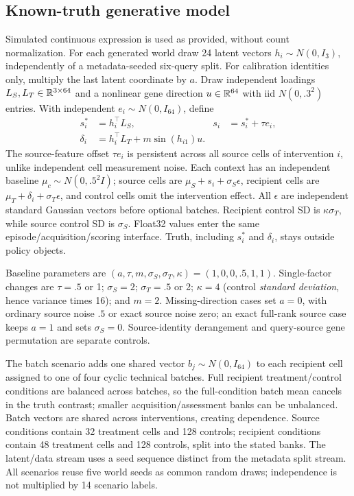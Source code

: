 \subsection{Known-truth generative model}
Simulated continuous expression is used as provided, without count normalization. For each generated world draw 24 latent vectors $h_i\sim N(0,I_3)$, independently of a metadata-seeded six-query split. For calibration identities only, multiply the last latent coordinate by $a$. Draw independent loadings $L_S,L_T\in\mathbb R^{3\times64}$ and a nonlinear gene direction $u\in\mathbb R^{64}$ with iid $N(0,.3^2)$ entries. With independent $e_i\sim N(0,I_{64})$, define
\begin{align}
 s_i^*&=h_i^\top L_S,&s_i&=s_i^*+\tau e_i,\\
 \delta_i&=h_i^\top L_T+m\sin(h_{i1})u.
\end{align}
The source-feature offset $\tau e_i$ is persistent across all source cells of intervention $i$, unlike independent cell measurement noise. Each context has an independent baseline $\mu_c\sim N(0,.5^2I)$; source cells are $\mu_S+s_i+\sigma_S\epsilon$, recipient cells are $\mu_T+\delta_i+\sigma_T\epsilon$, and control cells omit the intervention effect. All $\epsilon$ are independent standard Gaussian vectors before optional batches. Recipient control SD is $\kappa\sigma_T$, while source control SD is $\sigma_S$. Float32 values enter the same episode/acquisition/scoring interface. Truth, including $s_i^*$ and $\delta_i$, stays outside policy objects.

Baseline parameters are $(a,\tau,m,\sigma_S,\sigma_T,\kappa)=(1,0,0,.5,1,1)$. Single-factor changes are $\tau=.5$ or 1; $\sigma_S=2$; $\sigma_T=.5$ or 2; $\kappa=4$ (control \emph{standard deviation}, hence variance times 16); and $m=2$. Missing-direction cases set $a=0$, with ordinary source noise $.5$ or exact source noise zero; an exact full-rank source case keeps $a=1$ and sets $\sigma_S=0$. Source-identity derangement and query-source gene permutation are separate controls.

The batch scenario adds one shared vector $b_j\sim N(0,I_{64})$ to each recipient cell assigned to one of four cyclic technical batches. Full recipient treatment/control conditions are balanced across batches, so the full-condition batch mean cancels in the truth contrast; smaller acquisition/assessment banks can be unbalanced. Batch vectors are shared across interventions, creating dependence. Source conditions contain 32 treatment cells and 128 controls; recipient conditions contain 48 treatment cells and 128 controls, split into the stated banks. The latent/data stream uses a seed sequence distinct from the metadata split stream. All scenarios reuse five world seeds as common random draws; independence is not multiplied by 14 scenario labels.
